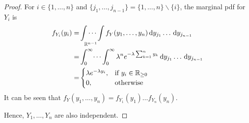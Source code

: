\documentclass[hwnumber=3,studentnumber=20053722]{mthe353answer}
\begin{document}
\begin{questions}
\begin{solution}
\begin{proof}
        For \(i \in \{1, \dots, n\}\) and \(\{j_1, \dots, j_{n-1}\} = \{1, \dots, n\} \backslash \{i\}\), the marginal pdf for \(Y_i\) is
        \begin{align*}
          f_{Y_i}(y_i) =& \idotsint \limits_{\mathbb{R}^{n-1}} f_Y(y_1, \dots, y_n) \, \textrm{d}y_{j_1} \dots \, \textrm{d}y_{j_{n-1}}\\
          =& \int_0^\infty \dots \int_0^\infty \lambda^n e^{-\lambda \sum_{k=1}^n y_k} \, \textrm{d}y_{j_1} \dots \, \textrm{d}y_{j_{n-1}}\\
          =&
          \begin{cases}
            \lambda e^{-\lambda y_i}, & \text{if } y_i \in \mathbb{R}_{\ge 0}\\
            0, & \text{otherwise}
          \end{cases}
        \end{align*}
        It can be seen that \(f_Y(y_1, \dots, y_n) = f_{Y_1}(y_1) \dots f_{Y_n}(y_n)\).

        Hence, \(Y_1, \dots, Y_n\) are also independent.
      \end{proof}
    \end{solution}
  \end{questions}
\end{document}
